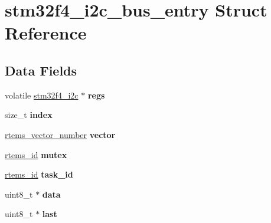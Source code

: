 \hypertarget{structstm32f4__i2c__bus__entry}{}\section{stm32f4\+\_\+i2c\+\_\+bus\+\_\+entry Struct Reference}
\label{structstm32f4__i2c__bus__entry}
\subsection*{Data Fields}
\begin{DoxyCompactItemize}
\item 
\mbox{\label{structstm32f4__i2c__bus__entry_adb90b95fcb94097a00188575e8235c5e}} 
volatile \mbox{\hyperlink{structstm32f4__i2c}{stm32f4\+\_\+i2c}} $\ast$ {\bfseries regs}
\item 
\mbox{\label{structstm32f4__i2c__bus__entry_a8681864830b9729be891e3040fc3f0cb}} 
size\+\_\+t {\bfseries index}
\item 
\mbox{\label{structstm32f4__i2c__bus__entry_a3d4d9befb56eb13bcf2fd51e482c51c4}} 
\mbox{\hyperlink{group__ClassicINTR_ga3e434c197d99f128e78cae4d9358bd8b}{rtems\+\_\+vector\+\_\+number}} {\bfseries vector}
\item 
\mbox{\label{structstm32f4__i2c__bus__entry_ade378a1e767e2ed8f679f3ad3599a194}} 
\mbox{\hyperlink{group__ClassicTasks_gab20892b814dced7dd4e5b9bf42becd57}{rtems\+\_\+id}} {\bfseries mutex}
\item 
\mbox{\label{structstm32f4__i2c__bus__entry_adfe6d7158a09c5ef1c7c851c78790ffa}} 
\mbox{\hyperlink{group__ClassicTasks_gab20892b814dced7dd4e5b9bf42becd57}{rtems\+\_\+id}} {\bfseries task\+\_\+id}
\item 
\mbox{\label{structstm32f4__i2c__bus__entry_a9a23a28e6a8bf77055d52dc47f39aa14}} 
uint8\+\_\+t $\ast$ {\bfseries data}
\item 
\mbox{\label{structstm32f4__i2c__bus__entry_a8a59f5449786c9f1e23342cb32484e33}} 
uint8\+\_\+t $\ast$ {\bfseries last}

\end{DoxyCompactItemize}
